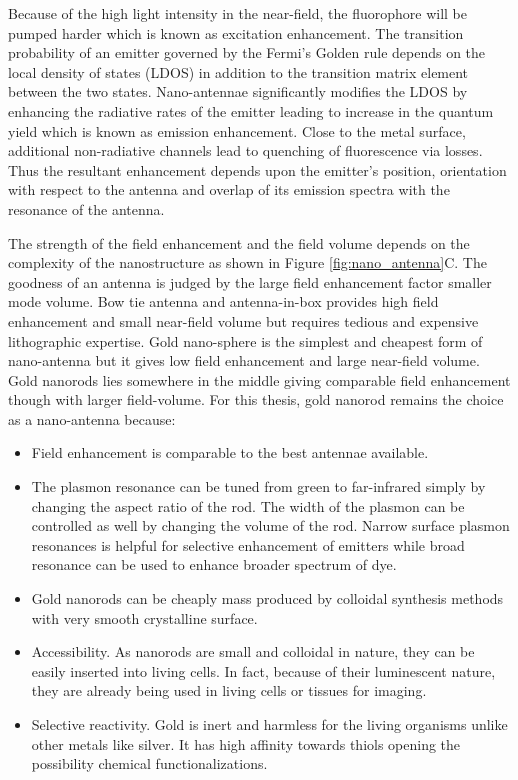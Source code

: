 Because of the high light intensity in the near-field, the fluorophore will be pumped harder which is known as excitation enhancement.
The transition probability of an emitter governed by the Fermi's Golden rule depends on the local density of states (LDOS) in addition to the transition matrix element between the two states.
Nano-antennae significantly modifies the LDOS by enhancing the radiative rates of the emitter leading to increase in the quantum yield which is known as emission enhancement.
Close to the metal surface, additional non-radiative channels lead to quenching of fluorescence via losses.
Thus the resultant enhancement depends upon the emitter's position, orientation with respect to the antenna and overlap of its emission spectra with the resonance of the antenna.

The strength of the field enhancement and the field volume depends on the complexity of the nanostructure as shown in Figure \ref{fig:nano_antenna}C.
The goodness of an antenna is judged by the large field enhancement factor smaller mode volume.
Bow tie antenna and antenna-in-box provides high field enhancement and small near-field volume but requires tedious and expensive lithographic expertise.\cite{novotny2011antennas,regmi2017thesis}
Gold nano-sphere is the simplest and cheapest form of nano-antenna but it gives low field enhancement and large near-field volume.\cite{punj2013gold}
Gold nanorods lies somewhere in the middle giving comparable field enhancement though with larger field-volume. For this thesis, gold nanorod remains the choice as a nano-antenna because:
\begin{itemize}
	\item Field enhancement is comparable to the best antennae available.
	\item The plasmon resonance can be tuned from green to far-infrared simply by changing the aspect ratio of the rod.\cite{link1999simulation}
	The width of the plasmon can be controlled as well by changing the volume of the rod.
	Narrow surface plasmon resonances is helpful for selective enhancement of emitters while broad resonance can be used to enhance broader spectrum of dye.\cite{yuan2013thousandfold,khatua2014resonant}
	\item Gold nanorods can be cheaply mass produced by colloidal synthesis methods with very smooth crystalline surface.\cite{nikoobakht2003preparation,perezjuste2005gold}
	\item Accessibility. As nanorods are small and colloidal in nature, they can be easily inserted into living cells.
	In fact, because of their luminescent nature, they are already being used in living cells or tissues for imaging.
	\item Selective reactivity. Gold is inert and harmless for the living organisms unlike other metals like silver.
	It has high affinity towards thiols opening the possibility chemical functionalizations.
\end{itemize}
%
